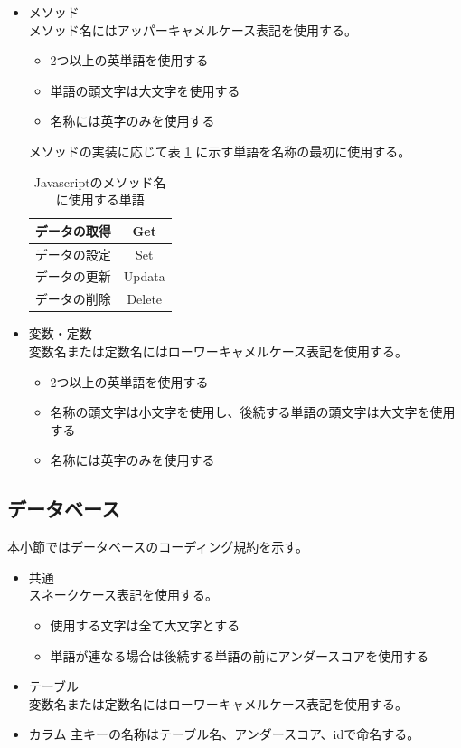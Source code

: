 \documentclass[a4j]{jarticle}
\begin{document}
\begin{itemize}
	\item メソッド\\
		メソッド名にはアッパーキャメルケース表記を使用する。
	\begin{itemize}
		\item 2つ以上の英単語を使用する
		\item 単語の頭文字は大文字を使用する
		\item 名称には英字のみを使用する
	\end{itemize}
		メソッドの実装に応じて表 \ref {tab:o3} に示す単語を名称の最初に使用する。
				\begin{table}[H]
			\caption{Javascriptのメソッド名に使用する単語}
			\label{tab:o3}
			\begin{center}
			\begin{tabular}{|c|c|}
			\hline
			データの取得 & Get\\\hline
			データの設定 & Set\\\hline
			データの更新  & Updata\\\hline
			データの削除  & Delete\\\hline
			\end{tabular}
			\end{center}
			\end{table}
	\item 変数・定数\\
		変数名または定数名にはローワーキャメルケース表記を使用する。
	\begin{itemize}
		\item 2つ以上の英単語を使用する
		\item 名称の頭文字は小文字を使用し、後続する単語の頭文字は大文字を使用する
		\item 名称には英字のみを使用する
	\end{itemize}
\end{itemize}
\subsection{データベース}
本小節ではデータベースのコーディング規約を示す。
	\begin{itemize}
	\item 共通\\
		スネークケース表記を使用する。
	\begin{itemize}
		\item 使用する文字は全て大文字とする
		\item 単語が連なる場合は後続する単語の前にアンダースコアを使用する
	\end{itemize}
	\item テーブル\\
		変数名または定数名にはローワーキャメルケース表記を使用する。
	\item カラム
		主キーの名称はテーブル名、アンダースコア、idで命名する。
\end{itemize}
\end{document}
